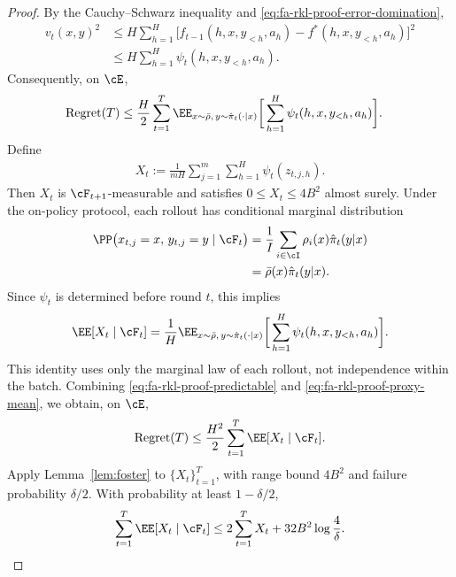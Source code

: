 \documentclass[11pt]{article}
\begin{document}
\begin{proof}
By the Cauchy--Schwarz inequality and
\eqref{eq:fa-rkl-proof-error-domination},
\begin{align*}
    v_t(x,y)^2
    &\leq
    H\sum_{h=1}^H
    \big[
        \hat f_{t-1}(h,x,y_{<h},a_h)
        -
        f^*(h,x,y_{<h},a_h)
    \big]^2\\
    &\leq
    H\sum_{h=1}^H
    \psi_t(h,x,y_{<h},a_h).
\end{align*}
Consequently, on $\cE$,
\begin{align}
    \operatorname{Regret}(T)
    &\leq
    \frac H2
    \sum_{t=1}^T
    \EE_{x\sim\bar\rho,\,
         y\sim\hat\pi_t(\cdot|x)}
    \bigg[
        \sum_{h=1}^H
        \psi_t(h,x,y_{<h},a_h)
    \bigg].
    \label{eq:fa-rkl-proof-predictable}
\end{align}
Define 
\begin{align*}
    X_t
    :=
    \frac1{mH}
    \sum_{j=1}^m\sum_{h=1}^H
    \psi_t(z_{t,j,h}).
\end{align*}
Then $X_t$ is $\cF_{t+1}$-measurable and satisfies
$0\leq X_t\leq4B^2$ almost surely.
Under the on-policy protocol, each rollout has conditional
marginal distribution
\begin{align*}
    \PP\bigl(
        x_{t,j}=x,\,
        y_{t,j}=y
        \mid\cF_t
    \bigr)
    &=
    \frac1I\sum_{i\in\cI}
    \rho_i(x)\hat\pi_t(y|x)\\
    &=
    \bar\rho(x)\hat\pi_t(y|x).
\end{align*}
Since $\psi_t$ is determined before round $t$, this implies
\begin{align}
    \EE[X_t\mid\cF_t]
    =
    \frac1H
    \EE_{x\sim\bar\rho,\,
         y\sim\hat\pi_t(\cdot|x)}
    \bigg[
        \sum_{h=1}^H
        \psi_t(h,x,y_{<h},a_h)
    \bigg].
    \label{eq:fa-rkl-proof-proxy-mean}
\end{align}
This identity uses only the marginal law of each rollout,
not independence within the batch.
Combining \eqref{eq:fa-rkl-proof-predictable} and
\eqref{eq:fa-rkl-proof-proxy-mean}, we obtain, on $\cE$,
\begin{align}
    \operatorname{Regret}(T)
    \leq
    \frac{H^2}{2}
    \sum_{t=1}^T\EE[X_t\mid\cF_t].
    \label{eq:fa-rkl-proof-predictable-proxy}
\end{align}
Apply Lemma~\ref{lem:foster} to $\{X_t\}_{t=1}^T$,
with range bound $4B^2$ and failure probability $\delta/2$.
With probability at least $1-\delta/2$,
\begin{align}
    \sum_{t=1}^T\EE[X_t\mid\cF_t]
    \leq
    2\sum_{t=1}^T X_t
    +
    32B^2\log\frac4\delta.

\end{align}
\end{proof}
\end{document}
